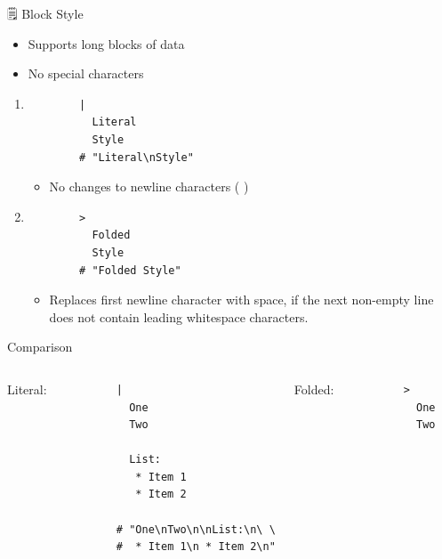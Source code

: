 \documentclass{beamer}
\newcommand{\code}[1]{
  \codebox{\texttt|#1|}
}
\begin{document}
\begin{frame}{🗒 Block Style}

  \begin{itemize}
    \item Supports long blocks of data
    \item No special characters
  \end{itemize}

  \begin{enumerate}
    \item
      \begin{verbatim}
        |
          Literal
          Style
        # "Literal\nStyle"
      \end{verbatim}
      \begin{itemize}
        \item No changes to newline characters (\code{\n})
      \end{itemize}

    \item
      \begin{verbatim}
        >
          Folded
          Style
        # "Folded Style"
      \end{verbatim}
      \begin{itemize}
        \item Replaces first newline character with space, if the next non-empty line does not contain leading whitespace characters.
    \end{itemize}

  \end{enumerate}

  \newpage
  \hspace{0pt}
  \vspace{-1cm}
  \vfill
  \begin{block}{Comparison}\
    \begin{columns}

      Literal:\\[0.2cm]
      \begin{verbatim}
        |
          One
          Two

          List:
           * Item 1
           * Item 2

        # "One\nTwo\n\nList:\n\ \
        #  * Item 1\n * Item 2\n"
      \end{verbatim}

      Folded:\\[0.2cm]
      \begin{verbatim}
        >
          One
          Two


\end{verbatim}
\end{columns}
\end{block}
\end{frame}
\end{document}
